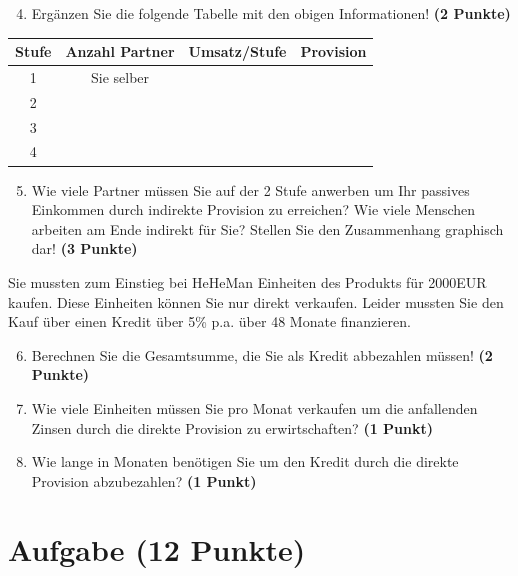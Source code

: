 \documentclass[a4paper, 9pt]{scrartcl}\usepackage[]{graphicx}\usepackage[]{xcolor}
\begin{document}
\begin{enumerate}
  \setcounter{enumi}{3}
\item Erg{\"a}nzen Sie die folgende Tabelle mit den obigen Informationen! \textbf{(2 Punkte)}
\end{enumerate}

\begin{center}
\begin{tabular}{c|c|c|c}
  \toprule
  \textbf{Stufe} & \textbf{Anzahl Partner}  & \textbf{Umsatz/Stufe} & \textbf{Provision}\\
  \midrule
  1 & Sie selber  &  & \\ \midrule
  2 &   &  &  \\ \midrule
  3 &   &  &  \\ \midrule
  4 &   &  &  \\
  \bottomrule
\end{tabular}
\end{center}

\begin{enumerate}
  \setcounter{enumi}{4}
\item Wie viele Partner m{\"u}ssen Sie auf der 2 Stufe anwerben um Ihr passives
  Einkommen durch indirekte Provision zu erreichen? Wie viele Menschen
  arbeiten am Ende indirekt f{\"u}r Sie? Stellen Sie den
  Zusammenhang graphisch dar!  \textbf{(3 Punkte)}
\end{enumerate}

Sie mussten zum Einstieg bei HeHeMan Einheiten des Produkts
f{\"u}r 2000EUR kaufen. Diese Einheiten k{\"o}nnen Sie nur direkt
verkaufen. Leider mussten Sie den Kauf {\"u}ber einen Kredit {\"u}ber
5\% p.a. {\"u}ber 48 Monate finanzieren.

\begin{enumerate}
  \setcounter{enumi}{5}
\item Berechnen Sie die Gesamtsumme, die Sie als Kredit abbezahlen m{\"u}ssen! \textbf{(2 Punkte)}
\item Wie viele Einheiten m{\"u}ssen Sie pro Monat verkaufen um die anfallenden Zinsen
  durch die direkte Provision zu erwirtschaften? \textbf{(1 Punkt)}
\item Wie lange in
  Monaten ben{\"o}tigen Sie um den Kredit durch die direkte
  Provision abzubezahlen? \textbf{(1 Punkt)}
\end{enumerate} 
\clearpage

\section{Aufgabe \hfill (12 Punkte)}
\end{document}
